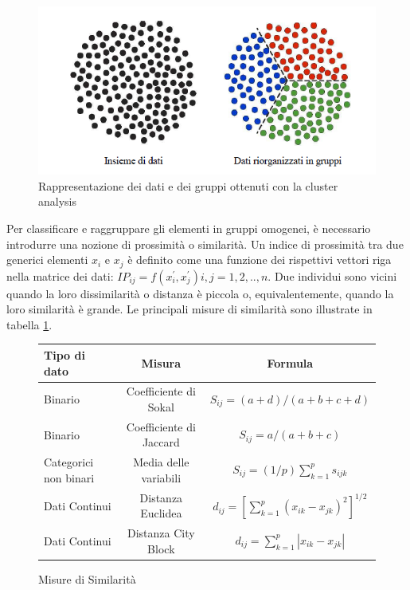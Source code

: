 \begin{figure}[]
	\centering
	\includegraphics[scale=0.8]{images/Esempio_Cluster.png}
	\caption{Rappresentazione dei dati e dei gruppi ottenuti con la cluster analysis}
\end{figure}
Per classificare e raggruppare gli elementi in gruppi omogenei, è necessario introdurre una nozione di prossimità o similarità. Un indice di prossimità tra due generici elementi $x_i$ e $x_j$ è definito come una funzione dei rispettivi vettori riga nella matrice dei dati: $IP_{ij} = f(x_{i}^{'},x_{j}^{'}) i,j=1,2,..,n$. Due individui sono vicini quando la loro dissimilarità o distanza è piccola o, equivalentemente, quando la loro similarità è grande. Le principali misure di similarità sono illustrate in tabella \ref{TAB:SIMILARITA'}.
\begin{figure}[h!]
	\centering
	\begin{tabular}{ l || c || c || }
		\multicolumn{1}{l||}{Tipo di dato} &  
		\multicolumn{1}{c||}{Misura} &
		\multicolumn{1}{c||}{Formula}\\
		\hline
		\hline
		Binario					&	Coefficiente di Sokal		&	$S_{ij}=(a+d)/(a+b+c+d)$	\\
		Binario					&	Coefficiente di Jaccard		& 	$S_{ij}=a/(a+b+c)$\\
		Categorici non binari	& 	Media delle variabili		&	$S_{ij}=(1/p) \sum_{k=1}^{p} s_{ijk}$\\
		Dati Continui			& 	Distanza Euclidea			&	$d_{ij}=[\sum_{k=1}^{p}(x_{ik}-x_{jk})^2]^{1/2}$\\
		Dati Continui			& 	Distanza City Block			&	$d_{ij}=\sum_{k=1}^{p}|x_{ik}-x_{jk}|$\\
		
	\end{tabular}
	\vspace{0.1cm}
	\caption{Misure di Similarità}
	\label{TAB:SIMILARITA'}
\end{figure}

